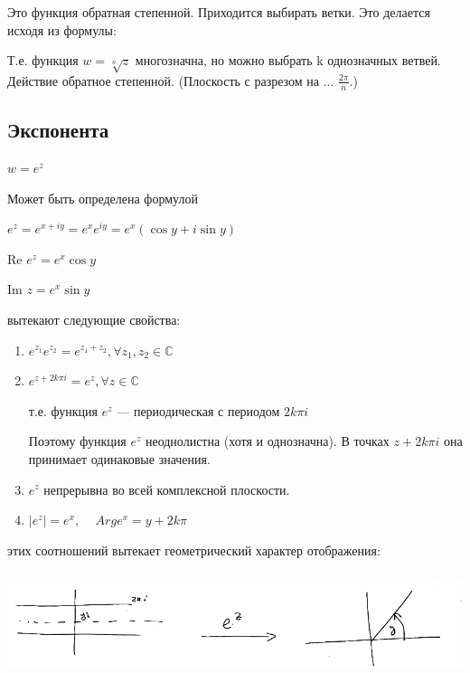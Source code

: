 \documentclass[a4paper, 12pt]{report}
\begin{document}
Это функция обратная степенной. Приходится выбирать ветки. Это делается исходя из формулы:


Т.е. функция $w = \sqrt[n]{z}$ многозначна, но можно выбрать k однозначных ветвей. Действие обратное степенной. (Плоскость с разрезом на ... $\frac{2\pi }{n}. $)

\subsection{Экспонента}
\begin{center}
    \textbf{$w = e^z$}
\end{center}

Может быть определена формулой 

\begin{center}
    $ e^z = e^{x+iy} = e^xe^{iy} = e^x(\cos y + i\sin y)$
    \par Re $e^z = e^x\cos y$
    \par Im $z = e^x\sin y$
\end{center} 



\par{} вытекают следующие свойства:
\par\bigskip
\begin{enumerate} 
  \item $e^{z_1}e^{z_2}=e^{z_1+z_2},$\quad$\forall z_1,z_2\in\mathbb{C}$
    
  \item $e^{z+2k\pi i}=e^z,$\quad$\forall z\in \mathbb{C}$
  \par т.е. функция $e^z$ --- периодическая с периодом $2k\pi$$i$ 
  \par Поэтому функция $e^z$ неоднолистна (хотя и однозначна). В точках $z+$$2k\pi$$i$ она принимает одинаковые значения.
  
  \item $e^z$ непрерывна во всей комплексной плоскости.
  
  \item $|e^z|=e^x$,$\quad$ $Arge^x=y+$$2k\pi$
\end{enumerate}

\par{} этих соотношений вытекает геометрический характер отображения:

\includegraphics[width=15cm, height=3cm]{exponenta 7/exp.png}
\end{document}
